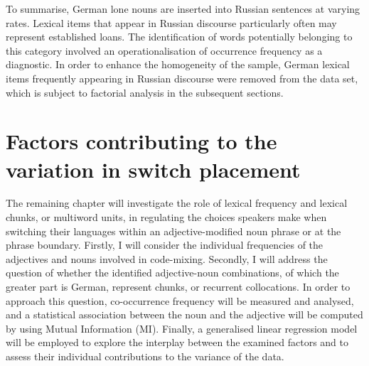 To summarise, German lone nouns are inserted into Russian sentences at varying rates. Lexical items that appear in Russian discourse particularly often may represent established loans. The identification of words potentially belonging to this category involved an operationalisation of occurrence frequency as a diagnostic. In order to enhance the homogeneity of the sample, German lexical items frequently appearing in Russian discourse were removed from the data set, which is subject to factorial analysis in the subsequent sections.

\section{Factors contributing to the variation in switch placement}

The remaining chapter will investigate the role of lexical frequency and lexical chunks, or multiword units, in regulating the choices speakers make when switching their languages within an adjective-modified noun phrase or at the phrase boundary. Firstly, I will consider the individual frequencies of the adjectives and nouns involved in code-mixing. Secondly, I will  address the question of whether the identified adjective-noun combinations, of which the greater part is German, represent chunks, or recurrent collocations. In order to approach this question, co-occurrence frequency will be measured and analysed, and a statistical association between the noun and the adjective will be computed by using Mutual Information (MI). Finally, a generalised linear regression model will be employed to explore the interplay between the examined factors and to assess their individual contributions to the variance of the data.


